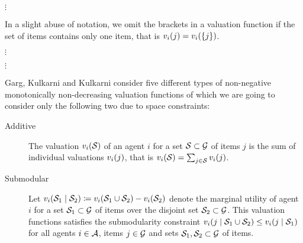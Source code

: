\(\vdots\)

In a slight abuse of notation, we omit the brackets in a valuation function if the set of items contains only one item, that is \(\valuations[i][j] = \valuations[i][\{j\}]\).

\(\vdots\)


\(\vdots\)

Garg, Kulkarni and Kulkarni consider five different types of non-negative monotonically non-decreasing valuation functions of which we are going to consider only the following two due to space constraints:
\begin{description}
	\item[Additive]
	The valuation \(\valuations[i][\genericset]\) of an agent \(i\) for a set \(\mathcal{S} \subset \mathcal{G}\) of items \(j\) is the sum of individual valuations \(\valuations[i][j]\), that is \(\valuations[i][\genericset] = \sum_{j \in \genericset} \valuations[i][j]\).

	\item[Submodular]
	Let \(\valuations[i][\genericset_1 \given \genericset_2] \coloneq \valuations[i][\genericset_1 \cup \genericset_2] - \valuations[i][\genericset_2]\) denote the marginal utility of agent~\(i\) for a set \(\mathcal{S}_1 \subset \mathcal{G}\) of items over the disjoint set \(\mathcal{S}_2 \subset \mathcal{G}\).
	This valuation functions satisfies the submodularity constraint \(\valuations[i][j \given \genericset_1 \cup \genericset_2] \leq \valuations[i][j \given \genericset_1]\) for all agents \(i \in \mathcal{A}\), items \(j \in \mathcal{G}\) and sets \(\mathcal{S}_1, \mathcal{S}_2 \subset \mathcal{G}\) of items.
\end{description}

\blindtext[4]